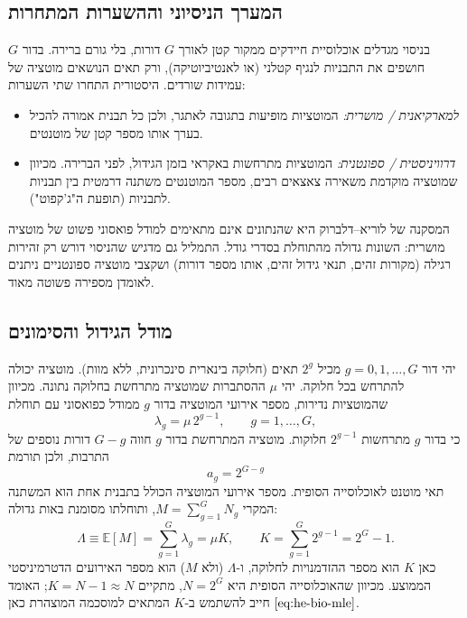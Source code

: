 \subsection*{המערך הניסיוני וההשערות המתחרות}
בניסוי מגדלים אוכלוסיית חיידקים ממקור קטן לאורך \(G\) דורות, בלי גורם ברירה. בדור \(G\) חושפים את התבניות לנגיף קטלני (או לאנטיביוטיקה), ורק תאים הנושאים מוטציה של עמידות שורדים. היסטורית התחרו שתי השערות:
\begin{itemize}
\item \emph{למארקיאנית / מושרית:} המוטציות מופיעות בתגובה לאתגר, ולכן כל תבנית אמורה להכיל בערך אותו מספר קטן של מוטנטים.
\item \emph{דרוויניסטית / ספונטנית:} המוטציות מתרחשות באקראי בזמן הגידול, לפני הברירה. מכיוון שמוטציה מוקדמת משאירה צאצאים רבים, מספר המוטנטים משתנה דרמטית בין תבניות לתבניות (תופעת ה"ג'קפוט").
\end{itemize}
המסקנה של לוריא--דלברוק היא שהנתונים אינם מתאימים למודל פואסוני פשוט של מוטציה מושרית: השונות גדולה מהתוחלת בסדרי גודל. התמליל גם מדגיש שהניסוי דורש רק זהירות רגילה (מקורות זהים, תנאי גידול זהים, אותו מספר דורות) ושקצבי מוטציה ספונטניים ניתנים לאומדן מספירה פשוטה מאוד.

\subsection*{מודל הגידול והסימונים}
יהי דור \(g=0,1,\dots,G\) מכיל \(2^{g}\) תאים (חלוקה בינארית סינכרונית, ללא מוות). מוטציה יכולה להתרחש בכל חלוקה. יהי \(\mu\) ההסתברות שמוטציה מתרחשת בחלוקה נתונה. מכיוון שהמוטציות נדירות, מספר אירועי המוטציה בדור \(g\) ממודל כפואסוני עם תוחלת
\begin{equation}\label{eq:he-bio-lambda-g}
\lambda_g = \mu\,2^{g-1}, \qquad g=1,\dots,G,
\end{equation}
כי בדור \(g\) מתרחשות \(2^{g-1}\) חלוקות. מוטציה המתרחשת בדור \(g\) חווה \(G-g\) דורות נוספים של התרבות, ולכן תורמת
\begin{equation}\label{eq:he-bio-clone-size}
a_g = 2^{G-g}
\end{equation}
תאי מוטנט לאוכלוסייה הסופית. מספר אירועי המוטציה הכולל בתבנית אחת הוא המשתנה המקרי \(M=\sum_{g=1}^{G}N_g\), ותוחלתו מסומנת באות גדולה:
\begin{equation}\label{eq:he-bio-Lambda-mean}
\Lambda\equiv\mathbb{E}[M]=\sum_{g=1}^{G}\lambda_g=\mu K,\qquad
K=\sum_{g=1}^{G}2^{g-1}=2^{G}-1.
\end{equation}
כאן \(K\) הוא מספר ההזדמנויות לחלוקה, ו-\(\Lambda\) (ולא \(M\)) הוא מספר האירועים הדטרמיניסטי הממוצע. מכיוון שהאוכלוסייה הסופית היא \(N=2^{G}\), מתקיים \(K=N-1\approx N\); האומד \(\eqref{eq:he-bio-mle}\) חייב להשתמש ב-\(K\) המתאים למוסכמה המוצהרת כאן.

